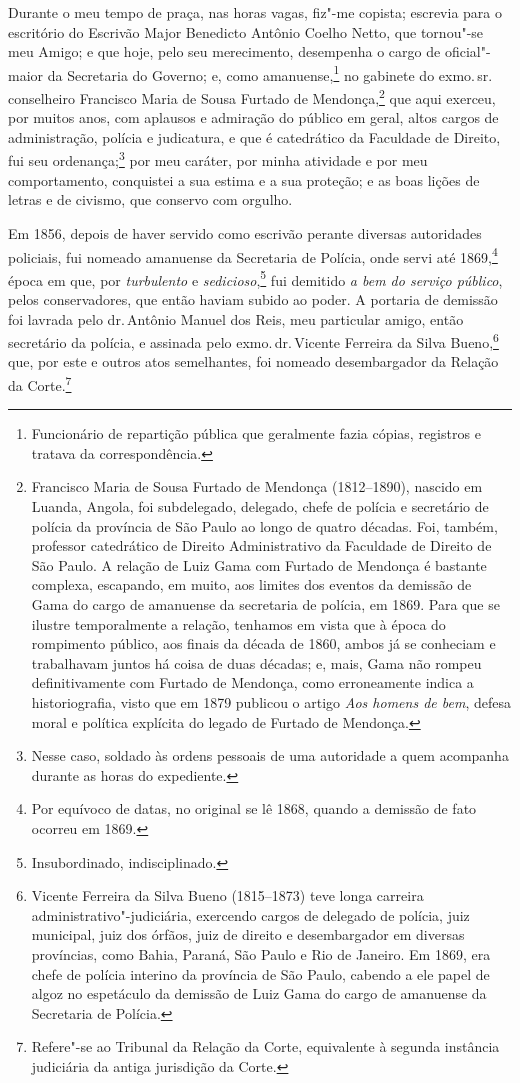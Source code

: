 Durante o meu tempo de praça, nas horas vagas, fiz"-me copista; escrevia
para o escritório do Escrivão Major Benedicto Antônio Coelho Netto, que
tornou"-se meu Amigo; e que hoje, pelo seu merecimento, desempenha o
cargo de oficial"-maior da Secretaria do Governo; e, como
amanuense,\footnote{Funcionário de repartição pública que geralmente
  fazia cópias, registros e tratava da correspondência.} no gabinete do
exmo.\,sr.\,conselheiro Francisco Maria de Sousa Furtado de
Mendonça,\footnote{Francisco Maria de Sousa Furtado de Mendonça \label{fmfm}
  (1812--1890), nascido em Luanda, Angola, foi subdelegado, delegado,
  chefe de polícia e secretário de polícia da província de São Paulo ao
  longo de quatro décadas. Foi, também, professor catedrático de Direito
  Administrativo da Faculdade de Direito de São Paulo. A relação de Luiz
  Gama com Furtado de Mendonça é bastante complexa, escapando, em muito,
  aos limites dos eventos da demissão de Gama do cargo de amanuense da
  secretaria de polícia, em 1869. Para que se ilustre temporalmente a
  relação, tenhamos em vista que à época do rompimento público, aos
  finais da década de 1860, ambos já se conheciam e trabalhavam juntos
  há coisa de duas décadas; e, mais, Gama não rompeu definitivamente com
  Furtado de Mendonça, como erroneamente indica a historiografia, visto
  que em 1879 publicou o artigo \emph{Aos homens de bem}, defesa moral e
  política explícita do legado de Furtado de Mendonça.} que aqui
exerceu, por muitos anos, com aplausos e admiração do público em geral,
altos cargos de administração, polícia e judicatura, e que é catedrático
da Faculdade de Direito, fui seu ordenança;\footnote{Nesse caso,
  soldado às ordens pessoais de uma autoridade a quem acompanha durante
  as horas do expediente.} por meu caráter, por minha atividade e por
meu comportamento, conquistei a sua estima e a sua proteção; e as boas
lições de letras e de civismo, que conservo com orgulho.

Em 1856, depois de haver servido como escrivão perante diversas
autoridades policiais, fui nomeado amanuense da Secretaria de Polícia,
onde servi até 1869,\footnote{Por equívoco de datas, no original se lê
  1868, quando a demissão de fato ocorreu em 1869.} época em que, por
\emph{turbulento} e \emph{sedicioso},\footnote{Insubordinado,
  indisciplinado.} fui demitido \emph{a bem do serviço público},
pelos conservadores, que então haviam subido ao poder. A portaria de
demissão foi lavrada pelo dr.\,Antônio Manuel dos Reis, meu particular
amigo, então secretário da polícia, e assinada pelo exmo.\,dr.\,Vicente
Ferreira da Silva Bueno,\footnote{Vicente Ferreira da Silva Bueno \label{bueno}
  (1815--1873) teve longa carreira administrativo"-judiciária, exercendo
  cargos de delegado de polícia, juiz municipal, juiz dos órfãos, juiz
  de direito e desembargador em diversas províncias, como Bahia, Paraná,
  São Paulo e Rio de Janeiro. Em 1869, era chefe de polícia interino da
  província de São Paulo, cabendo a ele papel de algoz no espetáculo da
  demissão de Luiz Gama do cargo de amanuense da Secretaria de Polícia.}
que, por este e outros atos semelhantes, foi nomeado desembargador da
Relação da Corte.\footnote{Refere"-se ao Tribunal da Relação da Corte,
  equivalente à segunda instância judiciária da antiga jurisdição da
  Corte.}

